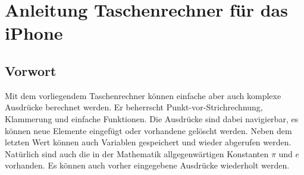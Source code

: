 \newcommand{\key}[1]{\textbf{[ #1 ]}}
\chapter{Anleitung Taschenrechner für das iPhone}
\section{Vorwort}
Mit dem vorliegendem Taschenrechner können einfache aber auch komplexe Ausdrücke berechnet werden.
Er beherrscht Punkt-vor-Strichrechnung, Klammerung und einfache Funktionen.
Die Ausdrücke sind dabei navigierbar, es können neue Elemente eingefügt oder vorhandene gelöscht werden.
Neben dem letzten Wert können auch Variablen gespeichert und wieder abgerufen werden.
Natürlich sind auch die in der Mathematik allgegenwärtigen Konstanten $\pi$ und $e$ vorhanden.
Es können auch vorher eingegebene Ausdrücke wiederholt werden.

